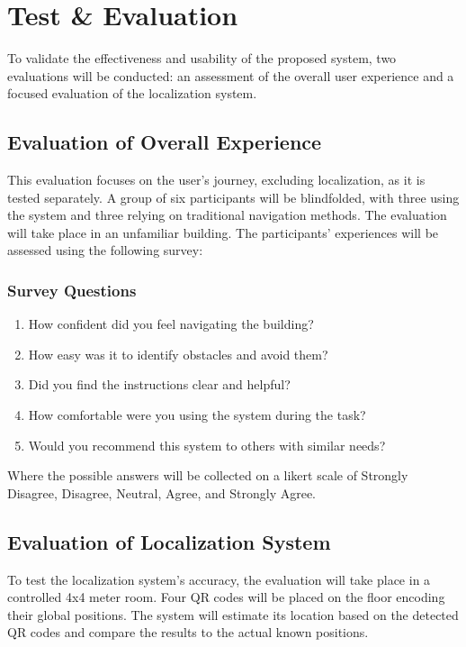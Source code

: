 \section{Test \& Evaluation}

To validate the effectiveness and usability of the proposed system, two evaluations will be conducted: an assessment of the overall user experience and a focused evaluation of the localization system.

\subsection{Evaluation of Overall Experience}

This evaluation focuses on the user's journey, excluding localization, as it is tested separately. A group of six participants will be blindfolded, with three using the system and three relying on traditional navigation methods. The evaluation will take place in an unfamiliar building. The participants’ experiences will be assessed using the following survey:

\subsubsection*{Survey Questions}
\begin{enumerate}
	\item How confident did you feel navigating the building?
	\item How easy was it to identify obstacles and avoid them?
	\item Did you find the instructions clear and helpful?
	\item How comfortable were you using the system during the task?
	\item Would you recommend this system to others with similar needs?
\end{enumerate}

Where the possible answers will be collected on a likert scale of Strongly Disagree, Disagree, Neutral, Agree, and Strongly Agree. 


\subsection{Evaluation of Localization System}

To test the localization system's accuracy, the evaluation will take place in a controlled 4x4 meter room. Four QR codes will be placed on the floor encoding their global positions. The system will estimate its location based on the detected QR codes and compare the results to the actual known positions.


